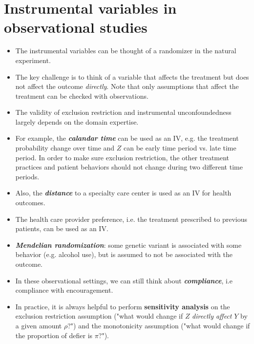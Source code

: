 \documentclass[11pt]{article}
\begin{document}
\section{Instrumental variables in observational studies}
\begin{itemize}
\item The instrumental variables can be thought of a randomizer in the natural experiment. 

\item The key challenge is to think of a variable that affects the treatment but does not affect the outcome \emph{directly}. Note that only assumptions that affect the treatment can be checked with observations. 

\item The validity of exclusion restriction and instrumental unconfoundedness largely depends on the domain expertise.

\item For example, the \emph{\textbf{calandar time}} can be used as an IV, e.g. the treatment probability change over time and $Z$ can be early time period vs. late time period. In order to make sure exclusion restriction, the other treatment practices and patient behaviors should not change during two different time periods. 

\item Also, the \emph{\textbf{distance}} to a specialty care center is used as an IV for health outcomes.

\item The health care provider preference, i.e. the treatment prescribed to previous patients, can be used as an IV.

\item \emph{\textbf{Mendelian randomization}}:  some genetic variant is associated with some behavior (e.g. alcohol use), but is assumed to not be associated with the outcome.

\item In these observational settings, we can still think about \emph{\textbf{compliance}}, i.e compliance with encouragement. 

\item In practice, it is always helpful to perform \textbf{sensitivity analysis} on the exclusion restriction assumption ("what would change if $Z$ \emph{directly affect} $Y$ by a given amount $\rho$?") and the monotonicity assumption ("what would change if the proportion of defier is $\pi$?").
\end{itemize}
\end{document}
